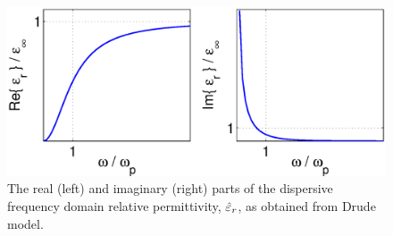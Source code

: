 \begin{figure}[htbp!]
  \begin{center}
    \includegraphics[scale=0.7]{Figures/Chapters/PhysicalProblem/drudePermittivity}
  \end{center}
  \caption{The real (left) and imaginary (right) parts of the dispersive
    frequency domain relative permittivity, $\hat{\varepsilon}_r$, as obtained from
    Drude model.}
  \label{fig:read-and-imag-effective-permittivity}
\end{figure}


